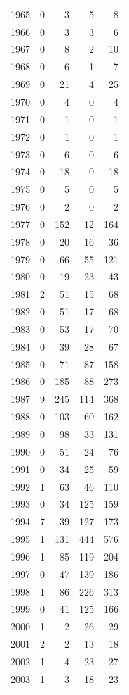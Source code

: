 \documentclass[
]{scrartcl}
\begin{document}
\begin{longtable}{rrrrr}
1965 & 0 & 3 & 5 & 8 \\ 
1966 & 0 & 3 & 3 & 6 \\ 
1967 & 0 & 8 & 2 & 10 \\ 
1968 & 0 & 6 & 1 & 7 \\ 
1969 & 0 & 21 & 4 & 25 \\ 
1970 & 0 & 4 & 0 & 4 \\ 
1971 & 0 & 1 & 0 & 1 \\ 
1972 & 0 & 1 & 0 & 1 \\ 
1973 & 0 & 6 & 0 & 6 \\ 
1974 & 0 & 18 & 0 & 18 \\ 
1975 & 0 & 5 & 0 & 5 \\ 
1976 & 0 & 2 & 0 & 2 \\ 
1977 & 0 & 152 & 12 & 164 \\ 
1978 & 0 & 20 & 16 & 36 \\ 
1979 & 0 & 66 & 55 & 121 \\ 
1980 & 0 & 19 & 23 & 43 \\ 
1981 & 2 & 51 & 15 & 68 \\ 
1982 & 0 & 51 & 17 & 68 \\ 
1983 & 0 & 53 & 17 & 70 \\ 
1984 & 0 & 39 & 28 & 67 \\ 
1985 & 0 & 71 & 87 & 158 \\ 
1986 & 0 & 185 & 88 & 273 \\ 
1987 & 9 & 245 & 114 & 368 \\ 
1988 & 0 & 103 & 60 & 162 \\ 
1989 & 0 & 98 & 33 & 131 \\ 
1990 & 0 & 51 & 24 & 76 \\ 
1991 & 0 & 34 & 25 & 59 \\ 
1992 & 1 & 63 & 46 & 110 \\ 
1993 & 0 & 34 & 125 & 159 \\ 
1994 & 7 & 39 & 127 & 173 \\ 
1995 & 1 & 131 & 444 & 576 \\ 
1996 & 1 & 85 & 119 & 204 \\ 
1997 & 0 & 47 & 139 & 186 \\ 
1998 & 1 & 86 & 226 & 313 \\ 
1999 & 0 & 41 & 125 & 166 \\ 
2000 & 1 & 2 & 26 & 29 \\ 
2001 & 2 & 2 & 13 & 18 \\ 
2002 & 1 & 4 & 23 & 27 \\ 
2003 & 1 & 3 & 18 & 23 \\ 

\end{longtable}
\end{document}
